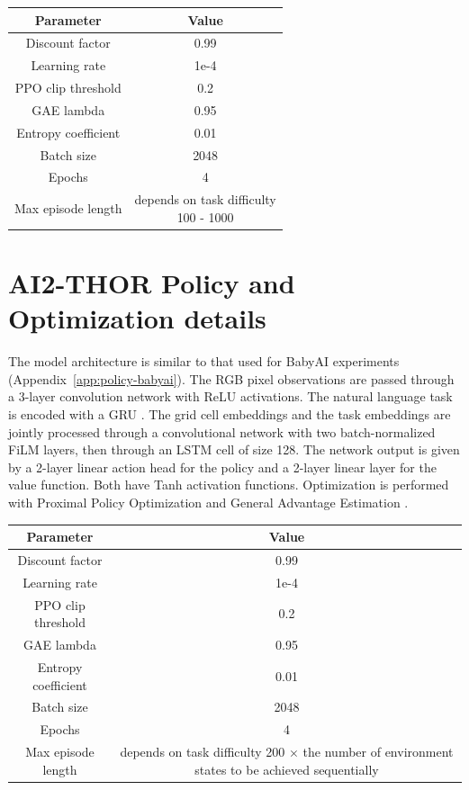 \documentclass{article} %
\begin{document}
\setlength{\tabcolsep}{3em}
\begin{table}[H]
\centering
\begin{tabular}{|c|c|}
\hline
\textbf{Parameter} & \textbf{Value} \\ \hline
Discount factor & 0.99 \\ \hline
Learning rate & 1e-4 \\ \hline
PPO clip threshold & 0.2 \\ \hline
GAE lambda & 0.95 \\ \hline
Entropy coefficient & 0.01 \\ \hline
Batch size & 2048 \\ \hline
Epochs & 4 \\ \hline
Max episode length & \makecell[t]{depends on task difficulty \\ 100 - 1000} \\ \hline
\end{tabular}
\end{table}

\section{AI2-THOR Policy and Optimization details}
\label{app:policy-thor}
The model architecture is similar to that used for BabyAI experiments (Appendix~\ref{app:policy-babyai}). The RGB pixel observations are passed through a 3-layer convolution network with ReLU activations. The natural language task is encoded with a GRU \citep{dey2017gate}. The grid cell embeddings and the task embeddings are jointly processed through a convolutional network with two batch-normalized FiLM \citep{perez2018film} layers, then through an LSTM cell of size 128. The network output is given by a 2-layer linear action head for the policy and a 2-layer linear layer for the value function. Both have Tanh activation functions. Optimization is performed with Proximal Policy Optimization \citep{ppo} and General Advantage Estimation \citep{gae}.

\setlength{\tabcolsep}{3em}
\begin{table}[H]
\centering
\begin{tabular}{|c|c|}
\hline
\textbf{Parameter} & \textbf{Value} \\ \hline
Discount factor & 0.99 \\ \hline
Learning rate & 1e-4 \\ \hline
PPO clip threshold & 0.2 \\ \hline
GAE lambda & 0.95 \\ \hline
Entropy coefficient & 0.01 \\ \hline
Batch size & 2048 \\ \hline
Epochs & 4 \\ \hline
Max episode length & \makecell[t]{depends on task difficulty \\ 200 $\times$ the number of environment states \\ to be achieved sequentially} \\ \hline
\end{tabular}
\end{table}
\end{document}
